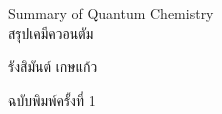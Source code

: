 

{
\thispagestyle{empty}

\begin{flushright}
    \vspace*{1.0in}
    
    \begin{spacing}{3}
    {\Huge Summary of Quantum Chemistry}\\
    {\LARGE สรุปเคมีควอนตัม}
    \end{spacing}
    
    \vspace{1.0in}
    
    {\LARGE  รังสิมันต์ เกษแก้ว}
    
    \vspace{1.5in}
    
    {\LARGE ฉบับพิมพ์ครั้งที่ 1}
    \vspace{0.5in}
    
    \vfill
\end{flushright}
}
